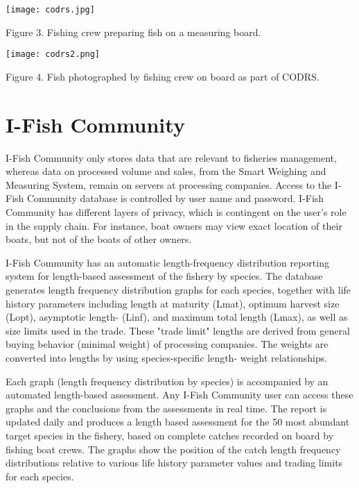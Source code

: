 \begin{center}
\graphicspath{{/root/R-project/IFishSnapperWPP712_713/Images/}}
\texttt{[image: codrs.jpg]}

Figure 3. Fishing crew preparing fish on a measuring board.
\end{center}

\begin{center}
\graphicspath{{/root/R-project/IFishSnapperWPP712_713/Images/}}
\texttt{[image: codrs2.png]}

Figure 4. Fish photographed by fishing crew on board as part of CODRS.
\end{center}

\clearpage
\newpage

\section{I-Fish Community}

I-Fish Community only stores data that are relevant to fisheries management, whereas data on processed volume and sales, from the Smart Weighing and Measuring System, remain on servers at processing companies. Access to the I-Fish Community database is controlled by user name and password. I-Fish Community has different layers of privacy, which is contingent on the user's role in the supply chain. For instance, boat owners may view exact location of their boats, but not of the boats of other owners.

I-Fish Community has an automatic length-frequency distribution reporting system for length-based assessment of the fishery by species. The database generates length frequency distribution graphs for each species, together with life history parameters including length at maturity (Lmat), optimum harvest size (Lopt), asymptotic length- (Linf), and maximum total length (Lmax), as well as size limits used in the trade. These "trade limit" lengths are derived from general buying behavior (minimal weight) of processing companies. The weights are converted into lengths by using species-specific length- weight relationships.

Each graph (length frequency distribution by species) is accompanied by an automated length-based assessment. Any I-Fish Community user can access these graphs and the conclusions from the assessments in real time. The report is updated daily and produces a length based assessment for the 50 most abundant target species in the fishery, based on complete catches recorded on board by fishing boat crews. The graphs show the position of the catch length frequency distributions relative to various life history parameter values and trading limits for each species.

